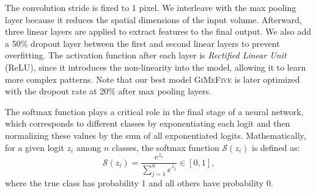 The convolution stride is fixed to 1 pixel. 
We interleave with the max pooling layer because it reduces the spatial dimensions of the input volume. 
Afterward, three linear layers are applied to extract features to the final output. 
We also add a 50\% dropout layer between the first and second linear layers to prevent overfitting. 
The activation function after each layer is \textit{Rectified Linear Unit} (ReLU), 
since it introduces the non-linearity into the model, 
allowing it to learn more complex patterns. 
Note that our best model \textsc{GiMeFive} is later optimized with the dropout rate at 20\% after max pooling layers. 

The softmax function plays a critical role in the final stage of a neural network, 
which corresponds to different classes by exponentiating each logit and then normalizing these values by the sum of all exponentiated logits. 
Mathematically, for a given logit $z_i$ among $n$ classes, 
the softmax function $\mathcal{S}(z_i)$ is defined as: 
\begin{equation}
  \label{eq:softmax}
  \mathcal{S}(z_i) = \frac{e^{z_i}}{\sum_{j=1}^{n} e^{z_j}} \in [0,1], 
\end{equation}
where the true class has probability 1 and all others have probability 0. 


